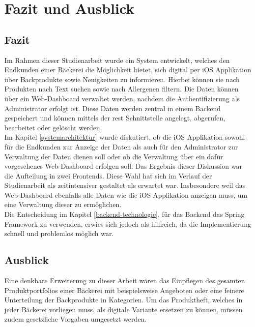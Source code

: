 \chapter{Fazit und Ausblick}

\section{Fazit}
Im Rahmen dieser Studienarbeit wurde ein System entwickelt, welches den Endkunden einer Bäckerei die Möglichkeit bietet, sich digital per iOS Applikation über Backprodukte sowie Neuigkeiten zu informieren. Hierbei können sie nach Produkten nach Text suchen sowie nach Allergenen filtern. Die Daten können über ein Web-Dashboard verwaltet werden, nachdem die Authentifizierung als Administrator erfolgt ist. Diese Daten werden zentral in einem Backend gespeichert und können mittels der \gls{rest} Schnittstelle angelegt, abgerufen, bearbeitet oder gelöscht werden.
\\
Im Kapitel \ref{systemarchitektur} wurde diskutiert, ob die iOS Applikation sowohl für die Endkunden zur Anzeige der Daten als auch für den Administrator zur Verwaltung der Daten dienen soll oder ob die Verwaltung über ein dafür vorgesehenes Web-Dashboard erfolgen soll. Das Ergebnis dieser Diskussion war die Aufteilung in zwei Frontends. Diese Wahl hat sich im Verlauf der Studienarbeit als zeitintensiver gestaltet als erwartet war. Insbesondere weil das Web-Dashboard ebenfalls alle Daten wie die iOS Applikation anzeigen muss, um eine Verwaltung dieser zu ermöglichen.
\\
Die Entscheidung im Kapitel \ref{backend-technologie}, für das Backend das Spring Framework zu verwenden, erwies sich jedoch als hilfreich, da die Implementierung schnell und problemlos möglich war.

\section{Ausblick}
Eine denkbare Erweiterung zu dieser Arbeit wären das Einpflegen des gesamten Produktportfolios einer Bäckerei mit beispielsweise Angeboten oder eine feinere Unterteilung der Backprodukte in Kategorien.
Um das Produktheft, welches in jeder Bäckerei vorliegen muss, als digitale Variante ersetzen zu können, müssen zudem gesetzliche Vorgaben umgesetzt werden.